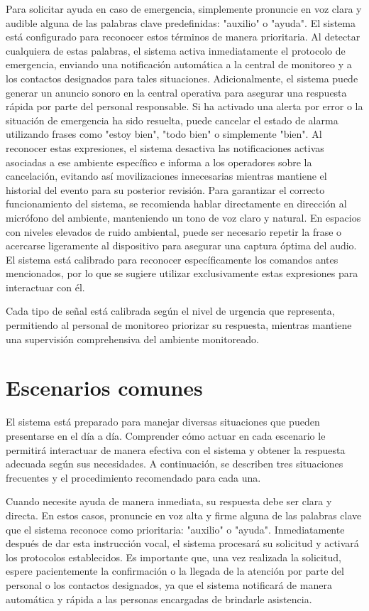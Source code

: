 Para solicitar ayuda en caso de emergencia, simplemente pronuncie en voz clara y audible alguna de las palabras clave predefinidas: "auxilio" o "ayuda". El sistema está configurado para reconocer estos términos de manera prioritaria. Al detectar cualquiera de estas palabras, el sistema activa inmediatamente el protocolo de emergencia, enviando una notificación automática a la central de monitoreo y a los contactos designados para tales situaciones. Adicionalmente, el sistema puede generar un anuncio sonoro en la central operativa para asegurar una respuesta rápida por parte del personal responsable. Si ha activado una alerta por error o la situación de emergencia ha sido resuelta, puede cancelar el estado de alarma utilizando frases como "estoy bien", "todo bien" o simplemente "bien". Al reconocer estas expresiones, el sistema desactiva las notificaciones activas asociadas a ese ambiente específico e informa a los operadores sobre la cancelación, evitando así movilizaciones innecesarias mientras mantiene el historial del evento para su posterior revisión. Para garantizar el correcto funcionamiento del sistema, se recomienda hablar directamente en dirección al micrófono del ambiente, manteniendo un tono de voz claro y natural. En espacios con niveles elevados de ruido ambiental, puede ser necesario repetir la frase o acercarse ligeramente al dispositivo para asegurar una captura óptima del audio. El sistema está calibrado para reconocer específicamente los comandos antes mencionados, por lo que se sugiere utilizar exclusivamente estas expresiones para interactuar con él.

Cada tipo de señal está calibrada según el nivel de urgencia que representa, permitiendo al personal de monitoreo priorizar su respuesta, mientras mantiene una supervisión comprehensiva del ambiente monitoreado.

\section*{Escenarios comunes}

El sistema está preparado para manejar diversas situaciones que pueden presentarse en el día a día. Comprender cómo actuar en cada escenario le permitirá interactuar de manera efectiva con el sistema y obtener la respuesta adecuada según sus necesidades. A continuación, se describen tres situaciones frecuentes y el procedimiento recomendado para cada una.

Cuando necesite ayuda de manera inmediata, su respuesta debe ser clara y directa. En estos casos, pronuncie en voz alta y firme alguna de las palabras clave que el sistema reconoce como prioritaria: "auxilio" o "ayuda". Inmediatamente después de dar esta instrucción vocal, el sistema procesará su solicitud y activará los protocolos establecidos. Es importante que, una vez realizada la solicitud, espere pacientemente la confirmación o la llegada de la atención por parte del personal o los contactos designados, ya que el sistema notificará de manera automática y rápida a las personas encargadas de brindarle asistencia.

